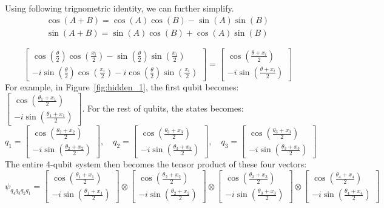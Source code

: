 \documentclass[12pt]{article}
\numberwithin{equation}{section}  %
\theoremstyle{definition}
\theoremstyle{plain}
\theoremstyle{remark}
\begin{document}
Using following trignometric identity, we can further simplify. 
\[\begin{aligned}
\cos(A+B)=\cos(A)\cos(B)-\sin(A)\sin(B)\\
\sin(A+B)=\sin(A)\cos(B)+\cos(A)\sin(B)
\end{aligned}\]

\[
\begin{bmatrix}
\cos(\frac{\theta}{2})\cos(\frac{x_i}{2})-\sin(\frac{\theta}{2})\sin(\frac{x_i}{2})\\
-i\sin(\frac{\theta}{2})\cos(\frac{x_i}{2})-i\cos(\frac{\theta}{2})\sin(\frac{x_i}{2})
\end{bmatrix}=\begin{bmatrix}\cos(\frac{\theta+x_i}{2})\\-i\sin(\frac{\theta+x_i}{2})\end{bmatrix}
\]
For example, in Figure~\ref{fig:hidden_1}, the first qubit becomes: 
$\begin{bmatrix}\cos(\frac{\theta_1+x_1}{2})\\-i\sin(\frac{\theta_1+x_1}{2})\end{bmatrix}$.
For the rest of qubits, the states becomes:
\[q_1=\begin{bmatrix}\cos(\frac{\theta_2+x_2}{2})\\-i\sin(\frac{\theta_2+x_2}{2})\end{bmatrix},\quad
q_2=\begin{bmatrix}\cos(\frac{\theta_3+x_3}{2})\\-i\sin(\frac{\theta_3+x_3}{2})\end{bmatrix},\quad
q_3=\begin{bmatrix}\cos(\frac{\theta_3+x_3}{2})\\-i\sin(\frac{\theta_3+x_3}{2})\end{bmatrix}\]
The entire 4-qubit system then becomes the tensor product of these four vectors:
\[\psi_{q_4q_3q_2q_1}=\begin{bmatrix}\cos(\frac{\theta_1+x_1}{2})\\-i\sin(\frac{\theta_1+x_1}{2})\end{bmatrix}\otimes
\begin{bmatrix}\cos(\frac{\theta_2+x_2}{2})\\-i\sin(\frac{\theta_2+x_2}{2})\end{bmatrix}\otimes
\begin{bmatrix}\cos(\frac{\theta_3+x_3}{2})\\-i\sin(\frac{\theta_3+x_3}{2})\end{bmatrix}\otimes
\begin{bmatrix}\cos(\frac{\theta_4+x_4}{2})\\-i\sin(\frac{\theta_4+x_4}{2})\end{bmatrix}\]
\end{document}
